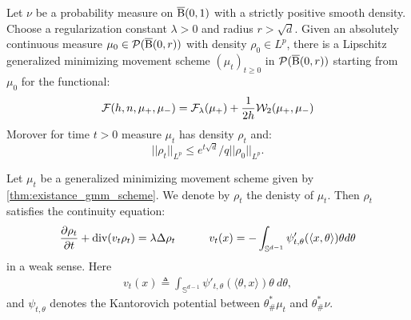 

\begin{thm} \label{thm:existance_gmm_scheme}
Let $\nu$ be a probability measure on $\operatorname{\overline{B}}(0,1)$ with a strictly positive smooth density. Choose a regularization constant $\lambda > 0$ and radius $r > \sqrt{d}$. Given an absolutely continuous measure $\mu_0 \in \mathcal{P}(\operatorname{\overline{B}}(0,r))$ with density $\rho_0 \in L^p$, there is a Lipschitz generalized minimizing movement scheme $(\mu_t)_{t\geq 0}$ in $\mathcal{P}(\operatorname{\overline{B}}(0,r))$ starting from $\mu_0$ for the functional:
\[
\mathcal{F}(h, n , \mu_+, \mu_-) = \mathcal{F}_{\lambda}(\mu_+) + \frac{1}{2h}{\cal W}_2(\mu_+, \mu_-)
\]
Morover for time $t > 0$ measure $\mu_t$ has density $\rho_t$ and:
\[
||\rho_t||_{L^p} \leq e^{t\sqrt{d}}/q ||\rho_0||_{L^p}.
\]
\end{thm}


\begin{thm}
Let $\mu_t$ be a generalized minimizing movement scheme given by \ref{thm:existance_gmm_scheme}. We denote by $\rho_t$ the denisty of $\mu_t$. Then $\rho_t$ satisfies the continuity equation:
\begin{align}
\frac{\partial \rho_t}{\partial t} + \text{div}(v_t \rho_t) = \lambda \Delta \rho_t  \quad \quad \quad v_t(x) = - \int_{\mathbb{S}^{d-1}} \psi_{t, \theta}'(\langle x , \theta \rangle ) \theta d\theta  \label{eqn:gradflow_reg}
\end{align}
in a weak sense. Here 
\begin{align}
v_t(x) \triangleq \int_{\mathbb{S}^{d-1}} \psi'_{t,\theta}(\langle \theta, x \rangle) \theta \> d\theta, \label{eqn:idt_v}
\end{align}
and $\psi_{t,\theta}$ denotes the Kantorovich potential between $\theta^*_{\#}\mu_t$ and $\theta^*_{\#}\nu$. 
\end{thm}

